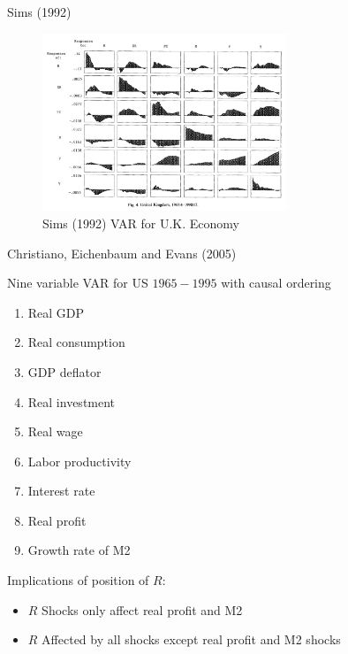 
\begin{frame}{Sims (1992)}

\begin{figure}
\caption[Sims (1992) VAR]{Sims (1992) VAR for U.K. Economy}
\centering
\label{fig:sims_uk}
\includegraphics[width=0.65\textwidth]{Figures/sims_uk.JPG}
\end{figure}

\end{frame}


\begin{frame}{Christiano, Eichenbaum and Evans (2005)}

Nine variable VAR for US $1965-1995$ with causal ordering
	\begin{enumerate}
	\item 	Real GDP
	\item	Real consumption
	\item	GDP deflator
	\item	Real investment
	\item	Real wage
	\item	Labor productivity
	\item 	Interest rate
	\item 	Real profit
	\item	Growth rate of M2
	\end{enumerate}

Implications of position of $R$:
	\begin{itemize}	
	\item	$R$ Shocks only affect real profit and M2
	\item	$R$ Affected by all shocks except real profit and M2 shocks
	\end{itemize}

\end{frame}

